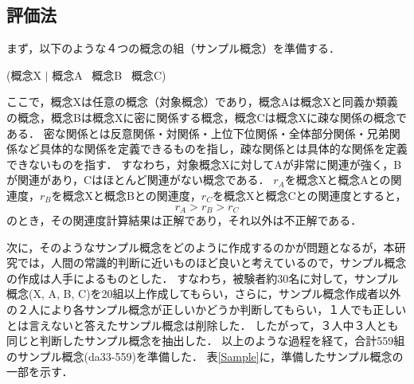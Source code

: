 \subsection{評価法}

まず，以下のような４つの概念の組（サンプル概念）を準備する．

\begin{center}
(概念X $|$ 概念A \ 概念B \ 概念C)
\end{center}

ここで，概念Xは任意の概念（対象概念）であり，概念Aは概念Xと同義か類義の概念，概念Bは概念Xに密に関係する概念，概念Cは概念Xに疎な関係の概念である．
密な関係とは反意関係・対関係・上位下位関係・全体部分関係・兄弟関係など具体的な関係を定義できるものを指し，疎な関係とは具体的な関係を定義できないものを指す．
すなわち，対象概念Xに対してAが非常に関連が強く，Bが関連があり，Cはほとんど関連がない概念である．
$r_A$を概念Xと概念Aとの関連度，$r_B$を概念Xと概念Bとの関連度，$r_C$を概念Xと概念Cとの関連度とすると，
\begin{equation}
	r_A > r_B > r_C
\end{equation}
のとき，その関連度計算結果は正解であり，それ以外は不正解である．

次に，そのようなサンプル概念をどのように作成するのかが問題となるが，本研究では，人間の常識的判断に近いものほど良いと考えているので，サンプル概念の作成は人手によるものとした．
すなわち，被験者約30名に対して，サンプル概念(X, A, B, C)を20組以上作成してもらい，さらに，サンプル概念作成者以外の２人により各サンプル概念が正しいかどうか判断してもらい，１人でも正しいとは言えないと答えたサンプル概念は削除した．
したがって，３人中３人とも同じと判断したサンプル概念を抽出した．
以上のような過程を経て，合計559組のサンプル概念(da33-559)を準備した．
表\ref{Sample}に，準備したサンプル概念の一部を示す．

